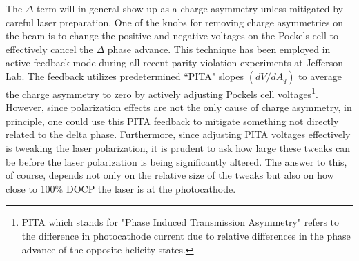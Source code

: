 \documentclass[12pt]{article}
\begin{document}
The $\Delta$ term will in general show up as a charge asymmetry unless mitigated by careful laser preparation. One of the knobs for removing charge asymmetries on the beam is to change the positive and negative voltages on the Pockels cell to effectively cancel the $\Delta$ phase advance. This technique has been employed in active feedback mode during all recent parity violation experiments at Jefferson Lab. The feedback utilizes predetermined ``PITA" slopes $(dV/dA_q)$ to average the charge asymmetry to zero by actively adjusting Pockels cell voltages\footnote{PITA which stands for "Phase Induced Transmission Asymmetry" refers to the difference in photocathode current due to relative differences in the phase advance  of the opposite helicity states.}. However, since polarization effects are not the only cause of charge asymmetry, in principle, one could use this PITA feedback to mitigate something not directly related to the delta phase. Furthermore, since adjusting PITA voltages effectively is tweaking the laser polarization, it is prudent to ask how large these tweaks can be before the laser polarization is being significantly altered. The answer to this, of course, depends not only on the relative size of the tweaks but also on how close to 100\% DOCP the laser is at the photocathode.
\end{document}
